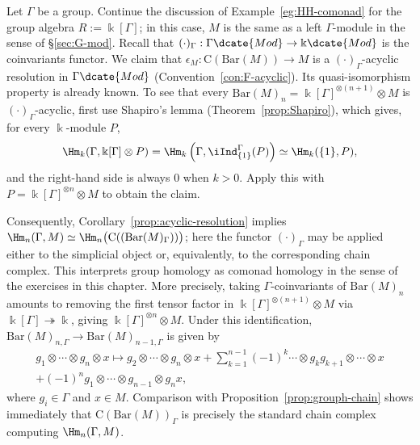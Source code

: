 \begin{example}\label{eg:group-H-comonad}
	Let $\Gamma$ be a group. Continue the discussion of
	Example~\ref{eg:HH-comonad} for the group algebra $R:=\Bbbk[\Gamma]$; in
	this case, $M$ is the same as a left $\Gamma$-module in the sense of
	\S\ref{sec:G-mod}. Recall that
	$(\mathord\cdot)_{\Gamma}:\Gamma\dcate{Mod}\to\Bbbk\dcate{Mod}$ is the
	coinvariants functor. We claim that
	$\epsilon_M:\mathrm{C}(\mathrm{Bar}(M))\to M$ is a
	$(\mathord\cdot)_{\Gamma}$-acyclic resolution in $\Gamma\dcate{Mod}$
	(Convention~\ref{con:F-acyclic}). Its quasi-isomorphism property is
	already known. To see that every
	$\mathrm{Bar}(M)_n=\Bbbk[\Gamma]^{\otimes(n+1)}\otimes M$ is
	$(\mathord\cdot)_{\Gamma}$-acyclic, first use Shapiro's lemma
	(Theorem~\ref{prop:Shapiro}), which gives, for every $\Bbbk$-module $P$,
	\[ \Hm_k(\Gamma, \Bbbk[\Gamma] \otimes P ) = \Hm_k\left( \Gamma, \iInd^{\Gamma}_{\{1\}}(P) \right) \simeq \Hm_k(\{1\}, P), \]
	and the right-hand side is always $0$ when $k>0$. Apply this with
	$P=\Bbbk[\Gamma]^{\otimes n}\otimes M$ to obtain the claim.

	Consequently, Corollary~\ref{prop:acyclic-resolution} implies
	$\Hm_n(\Gamma,M)\simeq
	\Hm_n\bigl(\mathrm{C}((\mathrm{Bar}(M)_{\Gamma}))\bigr)$; here the
	functor $(\mathord\cdot)_{\Gamma}$ may be applied either to the
	simplicial object or, equivalently, to the corresponding chain complex.
	This interprets group homology as comonad homology in the sense of the
	exercises in this chapter. More precisely, taking $\Gamma$-coinvariants
	of $\mathrm{Bar}(M)_n$ amounts to removing the first tensor factor in
	$\Bbbk[\Gamma]^{\otimes(n+1)}\otimes M$ via
	$\Bbbk[\Gamma]\twoheadrightarrow\Bbbk$, giving
	$\Bbbk[\Gamma]^{\otimes n}\otimes M$. Under this identification,
	$\mathrm{Bar}(M)_{n,\Gamma}\to\mathrm{Bar}(M)_{n-1,\Gamma}$ is given by
	\begin{multline*}
		g_1 \otimes \cdots \otimes g_n \otimes x \mapsto g_2 \otimes \cdots \otimes g_n \otimes x + \sum_{k=1}^{n-1} (-1)^k \cdots \otimes g_k g_{k+1} \otimes \cdots \otimes x \\
		+ (-1)^n g_1 \otimes \cdots \otimes g_{n-1} \otimes g_n x,
	\end{multline*}
	where $g_i\in\Gamma$ and $x\in M$. Comparison with
	Proposition~\ref{prop:grouph-chain} shows immediately that
	$\mathrm{C}(\mathrm{Bar}(M))_{\Gamma}$ is precisely the standard chain
	complex computing $\Hm_n(\Gamma,M)$.
\end{example}
